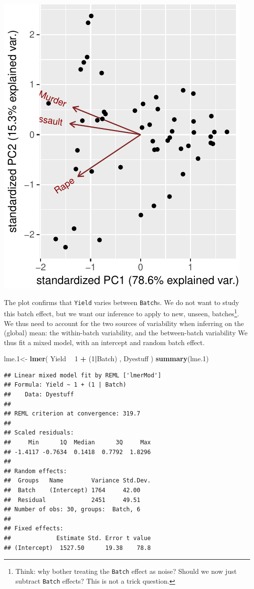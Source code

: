 \documentclass[]{book}
\newenvironment{Shaded}{\begin{snugshade}}{\end{snugshade}}
\newcommand{\DecValTok}[1]{\textcolor[rgb]{0.00,0.00,0.81}{#1}}
\newcommand{\FloatTok}[1]{\textcolor[rgb]{0.00,0.00,0.81}{#1}}
\newcommand{\KeywordTok}[1]{\textcolor[rgb]{0.13,0.29,0.53}{\textbf{#1}}}
\newcommand{\NormalTok}[1]{#1}
\newcommand{\OperatorTok}[1]{\textcolor[rgb]{0.81,0.36,0.00}{\textbf{#1}}}
\newcommand{\StringTok}[1]{\textcolor[rgb]{0.31,0.60,0.02}{#1}}
\theoremstyle{definition}
\theoremstyle{definition}
\theoremstyle{definition}
\theoremstyle{remark}
\begin{document}
\includegraphics[width=0.5\linewidth]{Rcourse_files/figure-latex/unnamed-chunk-199-1}

The plot confirms that \texttt{Yield} varies between \texttt{Batch}s.
We do not want to study this batch effect, but we want our inference to apply to new, unseen, batches\footnote{Think: why bother treating the \texttt{Batch} effect as noise? Should we now just subtract \texttt{Batch} effects? This is not a trick question.}.
We thus need to account for the two sources of variability when inferring on the (global) mean: the within-batch variability, and the between-batch variability
We thus fit a mixed model, with an intercept and random batch effect.

\begin{Shaded}
\begin{Highlighting}[]
\NormalTok{lme}\FloatTok{.1}\NormalTok{<-}\StringTok{ }\KeywordTok{lmer}\NormalTok{( Yield }\OperatorTok{~}\StringTok{ }\DecValTok{1} \OperatorTok{+}\StringTok{ }\NormalTok{(}\DecValTok{1}\OperatorTok{|}\NormalTok{Batch)  , Dyestuff )}
\KeywordTok{summary}\NormalTok{(lme}\FloatTok{.1}\NormalTok{)}
\end{Highlighting}
\end{Shaded}

\begin{verbatim}
## Linear mixed model fit by REML ['lmerMod']
## Formula: Yield ~ 1 + (1 | Batch)
##    Data: Dyestuff
## 
## REML criterion at convergence: 319.7
## 
## Scaled residuals: 
##     Min      1Q  Median      3Q     Max 
## -1.4117 -0.7634  0.1418  0.7792  1.8296 
## 
## Random effects:
##  Groups   Name        Variance Std.Dev.
##  Batch    (Intercept) 1764     42.00   
##  Residual             2451     49.51   
## Number of obs: 30, groups:  Batch, 6
## 
## Fixed effects:
##             Estimate Std. Error t value
## (Intercept)  1527.50      19.38    78.8
\end{verbatim}
\end{document}

